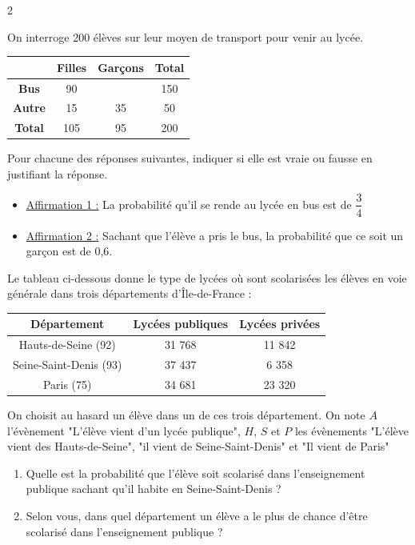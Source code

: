 \documentclass[10pt,a4paper]{article}
\begin{document}
\begin{multicols}{2}
\begin{exo}
    On interroge 200 élèves sur leur moyen de transport pour venir au lycée. 

    \begin{tabular}{|c|c|c|c|}
        \hline
    & \textbf{Filles} & \textbf{Garçons} & \textbf{Total} \\ \hline
    \textbf{Bus }& 90 &  & 150 \\ \hline
    \textbf{Autre}& 15 & 35 & 50    \\ \hline
    \textbf{Total} & 105 & 95 & 200 \\ \hline
    \end{tabular}

    Pour chacune des réponses suivantes, indiquer si elle est vraie ou fausse en justifiant la réponse.
    \begin{itemize}
        \item \underline{Affirmation 1  :} La probabilité qu'il se rende au lycée en bus est de \(\dfrac{3}{4}\)
        \item \underline{Affirmation 2  :} Sachant que l'élève a pris le bus, la probabilité que ce soit un garçon est de 0,6.
    \end{itemize}
\end{exo}


\begin{exo}[][appro]
    Le tableau ci-dessous donne le type de lycées où sont scolarisées les élèves en voie générale dans trois départements d'Île-de-France :

    \begin{tabular}{|c|c|c|}
        \hline
        Département & Lycées publiques & Lycées privées   \\
        \hline
        Hauts-de-Seine (92) & 31 768 & 11 842 \\
        \hline
        Seine-Saint-Denis (93) & 37 437 & 6 358 \\
        \hline 
        Paris (75) & 34 681 & 23 320 \\
        \hline
    \end{tabular}

    On choisit au hasard un élève dans un de ces trois département. On note \(A\) l'évènement "L'élève vient d'un lycée publique", \(H\), \(S\) et \(P\) les évènements "L'élève vient des Hauts-de-Seine", "il vient de Seine-Saint-Denis" et "Il vient de Paris"

    \begin{enumerate}
        \item Quelle est la probabilité que l'élève soit scolarisé dans l'enseignement publique sachant qu'il habite en Seine-Saint-Denis ?
        \item Selon vous, dans quel département un élève a le plus de chance d'être scolarisé dans l'enseignement publique ?
    \end{enumerate}
\end{exo}



\end{multicols}
\end{document}
